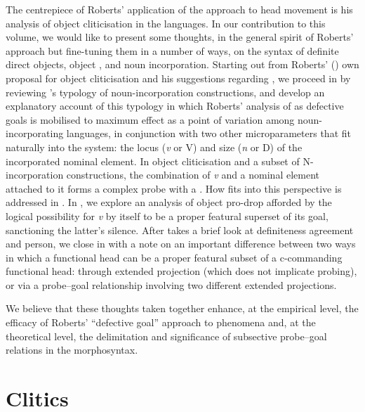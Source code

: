 \documentclass[output=paper]{langsci/langscibook}
\newcommand{\posscite}[1]{\citeauthor{#1}'s \citeyearpar{#1}}
\begin{document}
\begin{refcontext}
The centrepiece of Roberts' application of the  approach to head
movement is his analysis of object cliticisation in the  languages. In
our contribution to this volume, we would like to present some thoughts, in the
general spirit of Roberts’ approach but fine-tuning them in a number of ways,
on the syntax of definite direct objects, object , and noun
incorporation. Starting out from Roberts' (\citeyear{Roberts2010}) own proposal
for object cliticisation and his suggestions regarding , we
proceed in  by reviewing \posscite{mithun84} typology of
noun-incorporation constructions, and develop an explanatory account of this
typology in which Roberts' analysis of  as defective goals is mobilised
to maximum effect as a point of variation among noun-incorporating languages,
in conjunction with two other microparameters that fit naturally into the
system: the locus (\emph{v} or V) and size (\emph{n} or D) of the incorporated
nominal element. In object cliticisation and a subset of N-incorporation
constructions, the combination of \emph{v} and a nominal element attached to it
forms a complex probe with a . How  fits into this
perspective is addressed in . In , we
explore an analysis of object pro-drop afforded by the logical possibility for
\emph{v} by itself to be a proper featural superset of its goal, sanctioning
the latter's silence. After  takes a brief look at
definiteness agreement and person, we close in  with a note
on an important difference between two ways in which a functional head can be a
proper featural subset of a c-commanding functional head: through extended
projection (which does not implicate probing), or via a probe--goal relationship
involving two different extended projections.

We believe that these thoughts taken together enhance, at the empirical level,
the efficacy of Roberts' \enquote{defective goal} approach to 
phenomena and, at the theoretical level, the delimitation and significance of
subsective probe--goal relations in the morphosyntax.\largerpage[2]

\section{Clitics}
\label{sec:16.1}


\end{refcontext}
\end{document}

